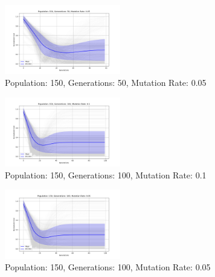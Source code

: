 \documentclass{article}
\begin{document}
    \begin{figure}[H]
        \centering
        \includegraphics[width=0.45\textwidth]{genetic_algorithm/appendix/Population_150_Generations_50_MutationRate_0.05}
        \caption{Population: 150, Generations: 50, Mutation Rate: 0.05}
        \label{fig:app_ga_150_50_05}
    \end{figure}

    \begin{figure}[H]
        \centering
        \includegraphics[width=0.45\textwidth]{genetic_algorithm/appendix/Population_150_Generations_100_MutationRate_0.1}
        \caption{Population: 150, Generations: 100, Mutation Rate: 0.1}
        \label{fig:app_ga_150_100_1}
    \end{figure}

    \begin{figure}[H]
        \centering
        \includegraphics[width=0.45\textwidth]{genetic_algorithm/appendix/Population_150_Generations_100_MutationRate_0.05}
        \caption{Population: 150, Generations: 100, Mutation Rate: 0.05}
        \label{fig:app_ga_150_100_05}
    \end{figure}
\end{document}
